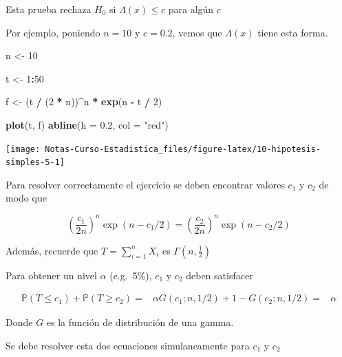 \documentclass[
  12pt,
]{book}
\newenvironment{Shaded}{\begin{snugshade}}{\end{snugshade}}
\newcommand{\DataTypeTok}[1]{\textcolor[rgb]{0.13,0.29,0.53}{#1}}
\newcommand{\DecValTok}[1]{\textcolor[rgb]{0.00,0.00,0.81}{#1}}
\newcommand{\FloatTok}[1]{\textcolor[rgb]{0.00,0.00,0.81}{#1}}
\newcommand{\KeywordTok}[1]{\textcolor[rgb]{0.13,0.29,0.53}{\textbf{#1}}}
\newcommand{\NormalTok}[1]{#1}
\newcommand{\OperatorTok}[1]{\textcolor[rgb]{0.81,0.36,0.00}{\textbf{#1}}}
\newcommand{\StringTok}[1]{\textcolor[rgb]{0.31,0.60,0.02}{#1}}
\begin{document}
Esta prueba rechaza \(H_0\) si \(\Lambda (x) \leq c\) para algún \(c\)

Por ejemplo, poniendo \(n=10\) y \(c = 0.2\), vemos que \(\Lambda (x)\)
tiene esta forma.

\begin{Shaded}
\begin{Highlighting}[]
\NormalTok{n \textless{}{-}}\StringTok{ }\DecValTok{10}

\NormalTok{t \textless{}{-}}\StringTok{ }\DecValTok{1}\OperatorTok{:}\DecValTok{50}

\NormalTok{f \textless{}{-}}\StringTok{ }\NormalTok{(t }\OperatorTok{/}\StringTok{ }\NormalTok{(}\DecValTok{2} \OperatorTok{*}\StringTok{ }\NormalTok{n))}\OperatorTok{\^{}}\NormalTok{n }\OperatorTok{*}\StringTok{ }\KeywordTok{exp}\NormalTok{(n }\OperatorTok{{-}}\StringTok{ }\NormalTok{t }\OperatorTok{/}\StringTok{ }\DecValTok{2}\NormalTok{)}

\KeywordTok{plot}\NormalTok{(t, f)}
\KeywordTok{abline}\NormalTok{(}\DataTypeTok{h =} \FloatTok{0.2}\NormalTok{, }\DataTypeTok{col =} \StringTok{"red"}\NormalTok{)}
\end{Highlighting}
\end{Shaded}

\begin{center}\texttt{[image: Notas-Curso-Estadistica\_files/figure-latex/10-hipotesis-simples-5-1]} \end{center}

Para resolver correctamente el ejercicio se deben encontrar valores \(c_1\) y
\(c_2\) de modo que

\[
\left(\frac{c_{1}}{2 n}\right)^{n} \exp \left(n-c_{1} / 2\right)=\left(\frac{c_{2}}{2 n}\right)^{n} \exp \left(n-c_{2} / 2\right)
\]

Además, recuerde que \(T = \sum_{i=1}^{n} X_i\) es \(\Gamma (n, \frac{1}{2})\)

Para obtener un nivel \(\alpha\) (e.g.~5\%), \(c_{1}\) y \(c_{2}\) deben satisfacer

\begin{align*}
\mathbb P (T \leq c_1) + \mathbb P(T\geq c_2) =& \alpha
G\left(c_{1} ; n, 1 / 2\right)+1-G\left(c_{2} ; n, 1 / 2\right)=&\alpha
\end{align*}

Donde \(G\) es la función de distribución de una gamma.

Se debe resolver esta dos ecuaciones simulaneamente para \(c_1\) y \(c_2\)
\end{document}
